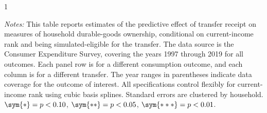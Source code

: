 \begin{table}[t!]
\begin{spacing}{1}
    \begin{tablenotes}
          \item \footnotesize \textit{Notes:} This table reports estimates of the predictive effect of transfer receipt on measures of household durable-goods ownership, conditional on current-income rank and being simulated-eligible for the transfer. The data source is the Consumer Expenditure Survey, covering the years 1997 through 2019 for all outcomes. Each panel row is for a different consumption outcome, and each column is for a different transfer. The year ranges in parentheses indicate data coverage for the outcome of interest. All specifications control flexibly for current-income rank using cubic basis splines. Standard errors are clustered by household. $\sym{*} = p < 0.10$, $\sym{**} = p < 0.05$, $\sym{***} = p < 0.01$.
          \end{tablenotes}
           \end{spacing}
    \end{table}
